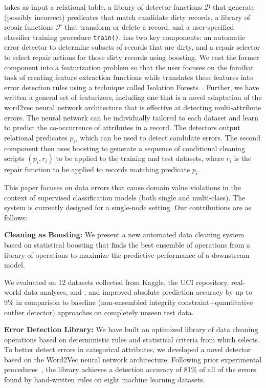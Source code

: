 \sys takes as input a relational table, a library of detector functions $\mathcal{D}$ that generate (possibly incorrect) predicates that match candidate dirty records, a library of repair functions $\mathcal{F}$ that transform or delete a record, and a user-specified classifier training procedure \texttt{train()}.
\sys has two key components: an automatic error detector to determine subsets of records that are dirty, and a repair selector to select repair actions for those dirty records using boosting.
We cast the former component into a featurization problem so that the user focuses on the familiar task of creating feature extraction functions while \sys translates these features into error detection rules using a technique called Isolation Forests~\cite{liu2008isolation}.  Further, we have written a general set of featurizers, including one that is a novel adaptation of the \textsf{word2vec} neural network architecture that is effective at detecting multi-attribute errors.  The neural network can be individually tailored to each dataset and learn to predict the co-occurrence of attributes in a record. 
The detectors output relational predicates $p_i$, which can be used to detect candidate errors.  The second component then uses boosting to generate a sequence of conditional cleaning scripts $(p_i, r_i)$ to be applied to the training and test datasets, where $r_i$ is the repair function to be applied to records matching predicate $p_i$.

This paper focuses on data errors that cause domain value violations in the context of supervised classification models (both single and multi-class).  The system is currently designed for a single-node setting. Our contributions are as follows:

\vspace{0.25em}\noindent\textbf{Cleaning as Boosting: } We present a new automated data cleaning system based on statistical boosting that finds the best ensemble of operations from a library of operations to maximize the predictive performance of a downstream model. 

 We evaluated \sys on 12 datasets collected from Kaggle, the UCI repository, real-world data analyses, and \company, and improved absolute prediction accuracy by up to $9\%$ in comparison to baseline (non-ensembled integrity constraint+quantitative outlier detector) approaches on completely unseen test data. 

\vspace{0.5em}\noindent\textbf{Error Detection Library: } We have built an optimized library of data cleaning operations based on deterministic rules and statistical criteria from which \sys selects. To better detect errors in categorical attributes, we developed a novel detector based on the \textsf{Word2Vec} neural network architecture. Following prior experimental procedures~\cite{DBLP:journals/pvldb/AbedjanCDFIOPST16}, the library achieves a detection accuracy of 81\% of all of the errors found by hand-written rules on eight machine learning datasets.  %

